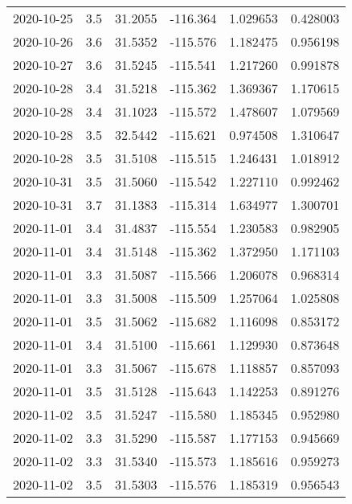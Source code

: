 \begin{tabular}{lrrrrr}
2020-10-25 &       3.5 &  31.2055 &  -116.364 &         1.029653 &         0.428003 \\
2020-10-26 &       3.6 &  31.5352 &  -115.576 &         1.182475 &         0.956198 \\
2020-10-27 &       3.6 &  31.5245 &  -115.541 &         1.217260 &         0.991878 \\
2020-10-28 &       3.4 &  31.5218 &  -115.362 &         1.369367 &         1.170615 \\
2020-10-28 &       3.4 &  31.1023 &  -115.572 &         1.478607 &         1.079569 \\
2020-10-28 &       3.5 &  32.5442 &  -115.621 &         0.974508 &         1.310647 \\
2020-10-28 &       3.5 &  31.5108 &  -115.515 &         1.246431 &         1.018912 \\
2020-10-31 &       3.5 &  31.5060 &  -115.542 &         1.227110 &         0.992462 \\
2020-10-31 &       3.7 &  31.1383 &  -115.314 &         1.634977 &         1.300701 \\
2020-11-01 &       3.4 &  31.4837 &  -115.554 &         1.230583 &         0.982905 \\
2020-11-01 &       3.4 &  31.5148 &  -115.362 &         1.372950 &         1.171103 \\
2020-11-01 &       3.3 &  31.5087 &  -115.566 &         1.206078 &         0.968314 \\
2020-11-01 &       3.3 &  31.5008 &  -115.509 &         1.257064 &         1.025808 \\
2020-11-01 &       3.5 &  31.5062 &  -115.682 &         1.116098 &         0.853172 \\
2020-11-01 &       3.4 &  31.5100 &  -115.661 &         1.129930 &         0.873648 \\
2020-11-01 &       3.3 &  31.5067 &  -115.678 &         1.118857 &         0.857093 \\
2020-11-01 &       3.5 &  31.5128 &  -115.643 &         1.142253 &         0.891276 \\
2020-11-02 &       3.5 &  31.5247 &  -115.580 &         1.185345 &         0.952980 \\
2020-11-02 &       3.3 &  31.5290 &  -115.587 &         1.177153 &         0.945669 \\
2020-11-02 &       3.3 &  31.5340 &  -115.573 &         1.185616 &         0.959273 \\
2020-11-02 &       3.5 &  31.5303 &  -115.576 &         1.185319 &         0.956543 \\

\end{tabular}
